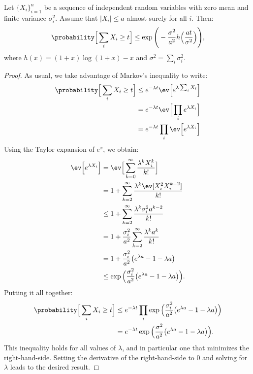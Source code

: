 \begin{lemma}
    Let $\{ X_i \}_{i=1}^n$ be a sequence of independent random variables with zero mean
    and finite variance $\sigma_i^2$. Assume that $\lvert X_i \rvert \leq a$ almost surely for all $i$. Then:
    \begin{equation*}
        \probability\Big[\sum_i X_i \geq t \Big] \leq 
        \exp \Bigg( -\frac{\sigma^2}{a^2} h\Big( \frac{a t}{\sigma^2} \Big) \Bigg),
    \end{equation*}
    where $h(x) = (1 + x) \log(1 + x) - x$ and $\sigma^2 = \sum_i \sigma_i^2$.
\end{lemma}
\begin{proof}
    As usual, we take advantage of Markov's inequality to write:
    \begin{align*}
        \probability\Big[\sum_i X_i \geq t \Big] &\leq
            e^{-\lambda t} \ev \Big[ e^{\lambda \sum_i X_i} \Big] \\
        &= e^{-\lambda t} \ev \Big[ \prod_i e^{\lambda X_i} \Big] \\
        &= e^{-\lambda t} \prod_i \ev \Big[ e^{\lambda X_i} \Big] \\
    \end{align*}
    Using the Taylor expansion of $e^x$, we obtain:
    \begin{align*}
        \ev \Big[ e^{\lambda X_i} \Big] &= \ev \Big[ \sum_{k=0}^\infty \frac{\lambda^k X_i^k}{k!} \Big] \\
        &= 1 + \sum_{k=2}^\infty \frac{\lambda^k \ev[X_i^2 X_i^{k - 2}]}{k!} \\
        &\leq 1 + \sum_{k=2}^\infty \frac{\lambda^k \sigma_i^2 a^{k-2}}{k!} \\
        &= 1 + \frac{\sigma_i^2}{a^2} \sum_{k=2}^\infty \frac{\lambda^k a^k}{k!} \\
        &= 1 + \frac{\sigma_i^2}{a^2} \big( e^{\lambda a} - 1 - \lambda a \big) \\
        &\leq \exp\Big( \frac{\sigma_i^2}{a^2} \big( e^{\lambda a} - 1 - \lambda a \big) \Big).
    \end{align*}
    Putting it all together:
    \begin{align*}
        \probability\Big[\sum_i X_i \geq t \Big] &\leq
            e^{-\lambda t} \prod_i \exp\Big( \frac{\sigma_i^2}{a^2} \big( e^{\lambda a} - 1 - \lambda a \big) \Big) \\
        &= e^{-\lambda t} \exp\Big( \frac{\sigma^2}{a^2} \big( e^{\lambda a} - 1 - \lambda a \big) \Big).
    \end{align*}
    This inequality holds for all values of $\lambda$, and in particular one that minimizes the
    right-hand-side. Setting the derivative of the right-hand-side to $0$ and solving for $\lambda$
    leads to the desired result.
\end{proof}

